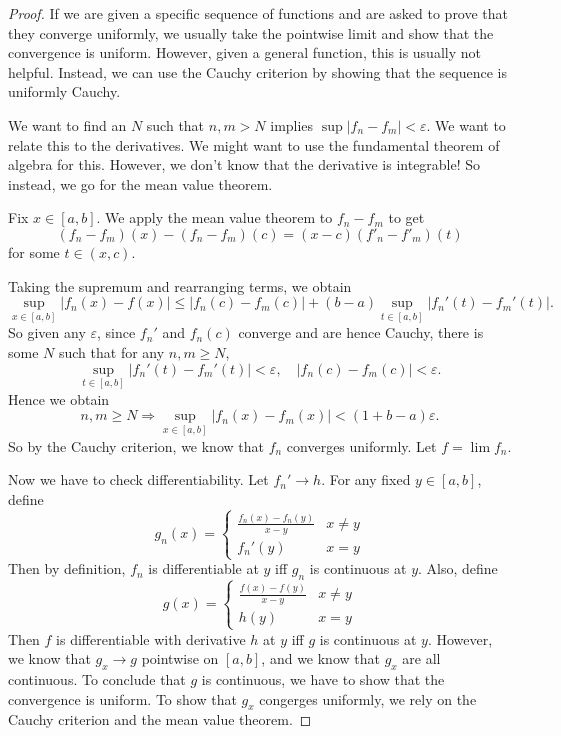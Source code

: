 \documentclass[a4paper]{article}
\begin{document}
\begin{proof}
  If we are given a specific sequence of functions and are asked to prove that they converge uniformly, we usually take the pointwise limit and show that the convergence is uniform. However, given a general function, this is usually not helpful. Instead, we can use the Cauchy criterion by showing that the sequence is uniformly Cauchy.

  We want to find an $N$ such that $n, m> N$ implies $\sup|f_n - f_m| < \varepsilon$. We want to relate this to the derivatives. We might want to use the fundamental theorem of algebra for this. However, we don't know that the derivative is integrable! So instead, we go for the mean value theorem.

  Fix $x\in [a, b]$. We apply the mean value theorem to $f_n - f_m$ to get
  \[
    (f_n - f_m)(x) - (f_n - f_m)(c) = (x - c)(f'_n - f'_m)(t)
  \]
  for some $t\in (x, c)$.

  Taking the supremum and rearranging terms, we obtain
  \[
    \sup_{x\in [a, b]}|f_n(x) - f(x)| \leq |f_n(c) - f_m(c)| + (b - a)\sup_{t\in [a, b]}|f_n'(t) - f_m'(t)|.
  \]
  So given any $\varepsilon$, since $f_n'$ and $f_n(c)$ converge and are hence Cauchy, there is some $N$ such that for any $n, m \geq N$,
  \[
    \sup_{t \in [a, b]} |f_n'(t) - f_m'(t)| < \varepsilon, \quad |f_n(c) - f_m(c)| < \varepsilon.
  \]
  Hence we obtain
  \[
    n, m \geq N \Rightarrow \sup_{x\in [a, b]}|f_n(x) - f_m(x)| < (1 + b - a) \varepsilon.
  \]
  So by the Cauchy criterion, we know that $f_n$ converges uniformly. Let $f = \lim f_n$.

  Now we have to check differentiability. Let $f_n' \to h$. For any fixed $y\in [a, b]$, define
  \[
    g_n(x) =
    \begin{cases}
      \frac{f_n(x) - f_n(y)}{x - y} & x \not= y\\
      f_n'(y) & x = y
    \end{cases}
  \]
  Then by definition, $f_n$ is differentiable at $y$ iff $g_n$ is continuous at $y$. Also, define
  \[
    g(x) =
    \begin{cases}
      \frac{f(x) - f(y)}{x - y} & x \not= y\\
      h(y) & x = y
    \end{cases}
  \]
  Then $f$ is differentiable with derivative $h$ at $y$ iff $g$ is continuous at $y$. However, we know that $g_x \to g$ pointwise on $[a, b]$, and we know that $g_x$ are all continuous. To conclude that $g$ is continuous, we have to show that the convergence is uniform. To show that $g_x$ congerges uniformly, we rely on the Cauchy criterion and the mean value theorem.


\end{proof}
\end{document}
